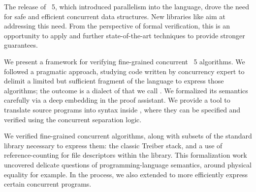 The release of \OCaml~5, which introduced parallelism into the language, drove the need for safe and efficient concurrent data structures.
New libraries like \Saturn%
aim at addressing this need.
From the perspective of formal verification, this is an opportunity to apply and further state-of-the-art techniques to provide stronger guarantees.

We present a framework for verifying fine-grained concurrent \OCaml~5 algorithms.
We followed a pragmatic approach, studying \OCaml code written by concurrency expert to delimit a limited but sufficient fragment of the language to express those algorithms; the outcome is a dialect of \OCaml that we call \ZooLang.
We formalized its semantics carefully via a deep embedding in the \Rocq proof assistant.
We provide a tool to translate source \OCaml programs into \ZooLang syntax inside \Rocq, where they can be specified and verified using the \Iris%
concurrent separation logic.

We verified fine-grained concurrent algorithms, along with subsets of the \OCaml standard library necessary to express them: the classic Treiber stack, and a use of reference-counting for file descriptors within the \Eio library.
This formalization work uncovered delicate questions of programming-language semantics, around physical equality for example.
In the process, we also extended \OCaml to more efficiently express certain concurrent programs.
